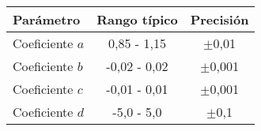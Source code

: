 	\begin{tabular}{lcc}
		\toprule
		\textbf{Parámetro} & \textbf{Rango típico} & \textbf{Precisión} \\
		\midrule
		Coeficiente $a$ & 0,85 - 1,15 & $\pm$0,01 \\
		Coeficiente $b$ & -0,02 - 0,02 & $\pm$0,001 \\
		Coeficiente $c$ & -0,01 - 0,01 & $\pm$0,001 \\
		Coeficiente $d$ & -5,0 - 5,0 & $\pm$0,1 \\
		\bottomrule
	\end{tabular}